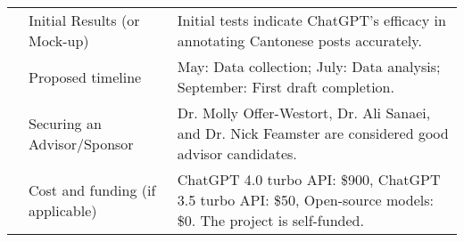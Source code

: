 \documentclass{article}
\begin{document}
\begin{tabularx}{\textwidth}{|l|X|X|}
    & Initial Results (or Mock-up) & Initial tests indicate ChatGPT's efficacy in annotating Cantonese posts accurately. \\ \cline{2-3}
    & Proposed timeline & May: Data collection; July: Data analysis; September: First draft completion. \\ \cline{2-3}
    & Securing an Advisor/Sponsor & Dr. Molly Offer-Westort, Dr. Ali Sanaei, and Dr. Nick Feamster are considered good advisor candidates. \\ \cline{2-3}
    & Cost and funding (if applicable) & ChatGPT 4.0 turbo API: \$900, ChatGPT 3.5 turbo API: \$50, Open-source models: \$0. The project is self-funded. \\ \hline
\end{tabularx}
\end{document}
